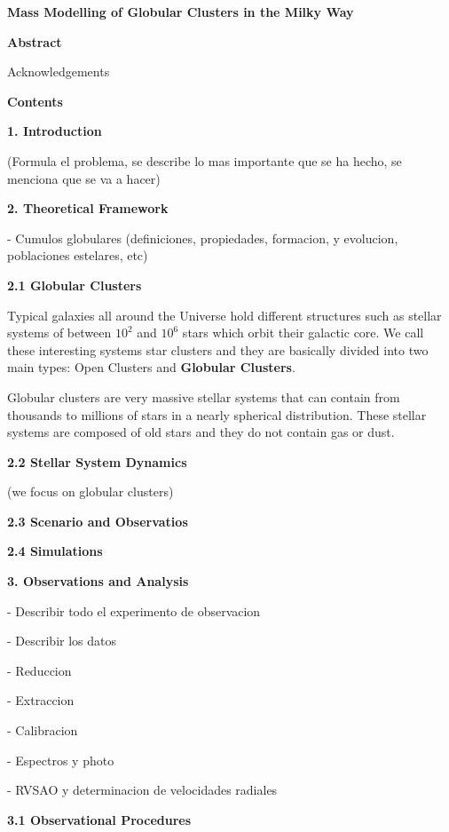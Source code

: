 \documentclass[english]{article}
\begin{document}
\parskip=3mm
\parindent=0mm

\begin{center}
\textbf{{\huge Mass Modelling of Globular Clusters in the Milky Way}}
\end{center}

\textbf{{\Large Abstract}}

Acknowledgements



\textbf{{\LARGE Contents}}



\textbf{{\LARGE 1. Introduction}}

(Formula el problema, se describe lo mas importante que se ha hecho, se menciona que se va a hacer)

\textbf{{\LARGE 2. Theoretical Framework}}


- Cumulos globulares (definiciones, propiedades, formacion, y evolucion, poblaciones estelares, etc)

\textbf{{\Large 2.1 Globular Clusters}}

Typical galaxies all around the Universe hold different structures such as stellar systems of between $ 10^{2} $ and $ 10^{6} $ stars which orbit their galactic core. We call these interesting systems star clusters and they are basically divided into two main types: Open Clusters and \textbf{Globular Clusters}.

Globular clusters are very massive stellar systems that can contain from thousands to millions of stars in a nearly spherical distribution. These stellar systems are composed of old stars and they do not contain gas or dust. 

\textbf{{\Large 2.2 Stellar System Dynamics}}

(we focus on globular clusters)

\textbf{{\Large 2.3 Scenario and Observatios}}

\textbf{{\Large 2.4 Simulations}}

\textbf{{\LARGE 3. Observations and Analysis}}

- Describir todo el experimento de observacion

- Describir los datos

- Reduccion

- Extraccion

- Calibracion

- Espectros y photo

- RVSAO y determinacion de velocidades radiales

\textbf{{\Large 3.1 Observational Procedures}}
\end{document}
